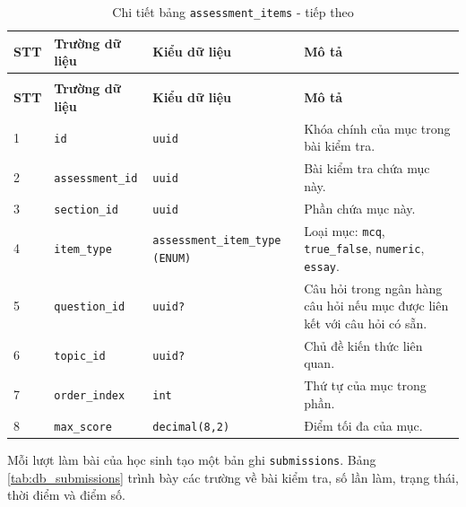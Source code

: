 \documentclass[../DoAn.tex]{subfiles}
\begin{document}
{\begin{longtable}{|p{}|p{}|p{}|p{}|}
\caption{Chi tiết bảng \texttt{assessment\_items}}
\label{tab:db_assessment_items}\\
\hline
\textbf{STT} & \textbf{Trường dữ liệu} & \textbf{Kiểu dữ liệu} & \textbf{Mô tả} \\ \hline
\endfirsthead
\caption[]{Chi tiết bảng \texttt{assessment\_items} - tiếp theo}\\
\hline
\textbf{STT} & \textbf{Trường dữ liệu} & \textbf{Kiểu dữ liệu} & \textbf{Mô tả} \\ \hline
\endhead
1 & \texttt{id} & \texttt{uuid} & Khóa chính của mục trong bài kiểm tra. \\ \hline
2 & \texttt{assessment\_id} & \texttt{uuid} & Bài kiểm tra chứa mục này. \\ \hline
3 & \texttt{section\_id} & \texttt{uuid} & Phần chứa mục này. \\ \hline
4 & \texttt{item\_type} & \texttt{assessment\_item\_type (ENUM)} & Loại mục: \texttt{mcq}, \texttt{true\_false}, \texttt{numeric}, \texttt{essay}. \\ \hline
5 & \texttt{question\_id} & \texttt{uuid?} & Câu hỏi trong ngân hàng câu hỏi nếu mục được liên kết với câu hỏi có sẵn. \\ \hline
6 & \texttt{topic\_id} & \texttt{uuid?} & Chủ đề kiến thức liên quan. \\ \hline
7 & \texttt{order\_index} & \texttt{int} & Thứ tự của mục trong phần. \\ \hline
8 & \texttt{max\_score} & \texttt{decimal(8,2)} & Điểm tối đa của mục. \\ \hline
\end{longtable}

Mỗi lượt làm bài của học sinh tạo một bản ghi \texttt{submissions}. Bảng \ref{tab:db_submissions} trình bày các trường về bài kiểm tra, số lần làm, trạng thái, thời điểm và điểm số.

}
\end{document}
